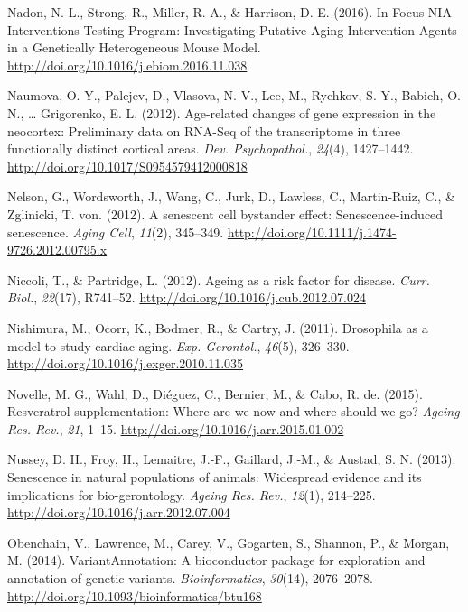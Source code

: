 \documentclass[12pt,twoside]{unicam}
\begin{document}
\begin{cslreferences}
\leavevmode\hypertarget{ref-Nadon2016}{}%
Nadon, N. L., Strong, R., Miller, R. A., \& Harrison, D. E. (2016). In Focus NIA Interventions Testing Program: Investigating Putative Aging Intervention Agents in a Genetically Heterogeneous Mouse Model. \url{http://doi.org/10.1016/j.ebiom.2016.11.038}

\leavevmode\hypertarget{ref-Naumova2012}{}%
Naumova, O. Y., Palejev, D., Vlasova, N. V., Lee, M., Rychkov, S. Y., Babich, O. N., \ldots{} Grigorenko, E. L. (2012). Age-related changes of gene expression in the neocortex: Preliminary data on RNA-Seq of the transcriptome in three functionally distinct cortical areas. \emph{Dev. Psychopathol.}, \emph{24}(4), 1427--1442. \url{http://doi.org/10.1017/S0954579412000818}

\leavevmode\hypertarget{ref-Nelson2012}{}%
Nelson, G., Wordsworth, J., Wang, C., Jurk, D., Lawless, C., Martin-Ruiz, C., \& Zglinicki, T. von. (2012). A senescent cell bystander effect: Senescence-induced senescence. \emph{Aging Cell}, \emph{11}(2), 345--349. \url{http://doi.org/10.1111/j.1474-9726.2012.00795.x}

\leavevmode\hypertarget{ref-Niccoli2012}{}%
Niccoli, T., \& Partridge, L. (2012). Ageing as a risk factor for disease. \emph{Curr. Biol.}, \emph{22}(17), R741--52. \url{http://doi.org/10.1016/j.cub.2012.07.024}

\leavevmode\hypertarget{ref-Nishimura2011}{}%
Nishimura, M., Ocorr, K., Bodmer, R., \& Cartry, J. (2011). Drosophila as a model to study cardiac aging. \emph{Exp. Gerontol.}, \emph{46}(5), 326--330. \url{http://doi.org/10.1016/j.exger.2010.11.035}

\leavevmode\hypertarget{ref-Novelle2015}{}%
Novelle, M. G., Wahl, D., Diéguez, C., Bernier, M., \& Cabo, R. de. (2015). Resveratrol supplementation: Where are we now and where should we go? \emph{Ageing Res. Rev.}, \emph{21}, 1--15. \url{http://doi.org/10.1016/j.arr.2015.01.002}

\leavevmode\hypertarget{ref-Nussey2013}{}%
Nussey, D. H., Froy, H., Lemaitre, J.-F., Gaillard, J.-M., \& Austad, S. N. (2013). Senescence in natural populations of animals: Widespread evidence and its implications for bio-gerontology. \emph{Ageing Res. Rev.}, \emph{12}(1), 214--225. \url{http://doi.org/10.1016/j.arr.2012.07.004}

\leavevmode\hypertarget{ref-Obenchain2014}{}%
Obenchain, V., Lawrence, M., Carey, V., Gogarten, S., Shannon, P., \& Morgan, M. (2014). VariantAnnotation: A bioconductor package for exploration and annotation of genetic variants. \emph{Bioinformatics}, \emph{30}(14), 2076--2078. \url{http://doi.org/10.1093/bioinformatics/btu168}


\end{cslreferences}
\end{document}
